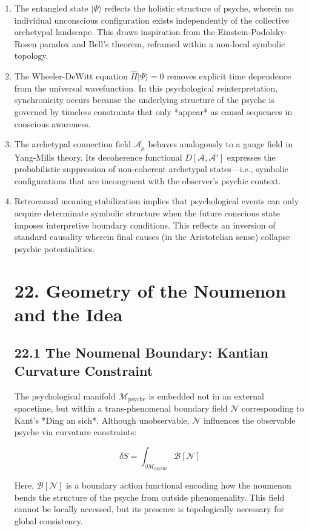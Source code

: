 \documentclass[12pt]{article}
\begin{document}
\begin{enumerate}
    \item The entangled state $|\Psi\rangle$ reflects the holistic structure of psyche, wherein no individual unconscious configuration exists independently of the collective archetypal landscape. This draws inspiration from the Einstein-Podolsky-Rosen paradox and Bell's theorem, reframed within a non-local symbolic topology.
    \item The Wheeler-DeWitt equation $\hat{H}|\Psi\rangle = 0$ removes explicit time dependence from the universal wavefunction. In this psychological reinterpretation, synchronicity occurs because the underlying structure of the psyche is governed by timeless constraints that only *appear* as causal sequences in conscious awareness.
    \item The archetypal connection field $\mathcal{A}_\mu$ behaves analogously to a gauge field in Yang-Mills theory. Its decoherence functional $D[\mathcal{A}, \mathcal{A}']$ expresses the probabilistic suppression of non-coherent archetypal states—i.e., symbolic configurations that are incongruent with the observer’s psychic context.
    \item Retrocausal meaning stabilization implies that psychological events can only acquire determinate symbolic structure when the future conscious state imposes interpretive boundary conditions. This reflects an inversion of standard causality wherein final causes (in the Aristotelian sense) collapse psychic potentialities.

\section*{22. Geometry of the Noumenon and the Idea}

\subsection*{22.1 The Noumenal Boundary: Kantian Curvature Constraint}

The psychological manifold $\mathcal{M}_\text{psyche}$ is embedded not in an external spacetime,  
but within a trans-phenomenal boundary field $\mathcal{N}$ corresponding to Kant's *Ding an sich*.  
Although unobservable, $\mathcal{N}$ influences the observable psyche via curvature constraints:

\[
\delta S = \int_{\partial \mathcal{M}_\text{psyche}} \mathcal{B}[\mathcal{N}]
\]

Here, $\mathcal{B}[\mathcal{N}]$ is a boundary action functional encoding how the noumenon bends the structure of the psyche from outside phenomenality.  
This field cannot be locally accessed, but its presence is topologically necessary for global consistency.


\end{enumerate}
\end{document}
